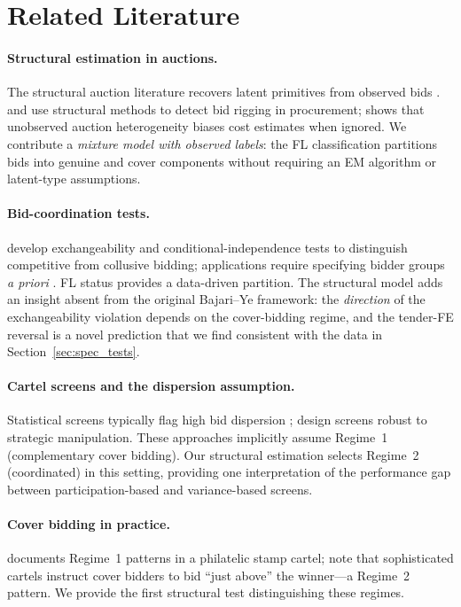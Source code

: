 \section{Related Literature}
\label{sec:literature}

\paragraph{Structural estimation in auctions.}
The structural auction literature recovers latent primitives from
observed bids \citep{guerre2000optimal, athey2001information}.
\citet{porter1993detection} and \citet{pesendorfer2000study} use
structural methods to detect bid rigging in procurement;
\citet{krasnokutskaya2011bid} shows that unobserved auction
heterogeneity biases cost estimates when ignored.
We contribute a \emph{mixture model with observed labels}: the FL
classification partitions bids into genuine and cover components
without requiring an EM algorithm or latent-type assumptions.

\paragraph{Bid-coordination tests.}
\citet{bajari2003deciding} develop exchangeability and
conditional-independence tests to distinguish competitive from
collusive bidding; applications require specifying bidder groups
\emph{a priori} \citep{conley2016detecting}. FL status provides a
data-driven partition. The structural model adds an insight absent
from the original Bajari--Ye framework: the \emph{direction} of
the exchangeability violation depends on the cover-bidding
regime, and the tender-FE reversal is a novel prediction that we
find consistent with the data in Section~\ref{sec:spec_tests}.

\paragraph{Cartel screens and the dispersion assumption.}
Statistical screens typically flag high bid dispersion
\citep{abrantesmetz2006a, imhof2019detecting, huber2019machine};
\citet{chassang2022robust} design screens robust to strategic
manipulation. These approaches implicitly assume Regime~1
(complementary cover bidding). Our structural estimation selects
Regime~2 (coordinated) in this setting, providing one
interpretation of the performance gap between participation-based
and variance-based screens.

\paragraph{Cover bidding in practice.}
\citet{asker2010leniency} documents Regime~1 patterns in a
philatelic stamp cartel; \citet{marshall2012economics} note that
sophisticated cartels instruct cover bidders to bid ``just above''
the winner---a Regime~2 pattern. We provide the first structural
test distinguishing these regimes.

